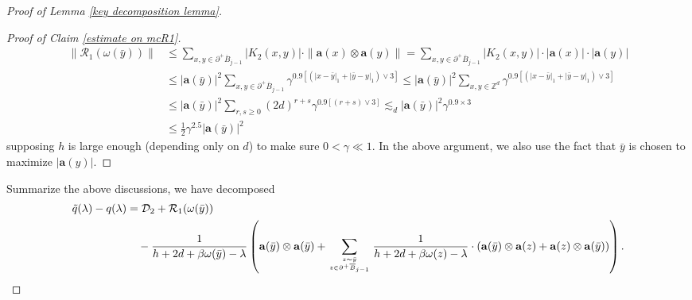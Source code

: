 \documentclass[10pt,a4paper]{amsart}
\newcommand{\Z}{\mathbb{Z}}
\newcommand{\barB}{\overline{B}}
\newcommand{\bfa}{\mathbf{a}}
\newcommand{\mcD}{\mathcal{D}}
\newcommand{\mcR}{\mathcal{R}}
\newcommand{\tq}{\tilde{q}}
\begin{document}
\begin{proof}[Proof of Lemma \ref{key decomposition lemma}]
\begin{proof}[Proof of Claim \ref{estimate on mcR1}]
  \begin{align*}
    \| \mcR_{1}(\omega(\bar{y})) \| & \leq \sum_{x,y\in \partial^+ \barB_{j-1}} |K_2(x,y)|\cdot \| \bfa(x)\otimes \bfa(y) \| = \sum_{x,y\in \partial^+ \barB_{j-1}} |K_2(x,y)|\cdot | \bfa(x)|\cdot |\bfa(y) | \\
          &\leq |\bfa(\bar{y})|^2 \sum_{x,y\in \partial^+ \barB_{j-1}} \gamma^{0.9[(|x-\bar{y}|_1+|\bar{y}-y|_1)\vee 3]} \leq |\bfa(\bar{y})|^2 \sum_{x,y\in \Z^d } \gamma^{0.9[(|x-\bar{y}|_1+|\bar{y}-y|_1)\vee 3]} \\
          &\leq |\bfa(\bar{y})|^2 \sum_{r,s\geq 0} (2d)^{r+s}\gamma^{0.9[(r+s)\vee 3]} \lesssim_d |\bfa(\bar{y})|^2 \gamma^{0.9\times 3} \\
          &\leq \frac{1}{2}\gamma^{2.5} |\bfa(\bar{y})|^2 
  \end{align*}
  supposing $h$ is large enough (depending only on $d$) to make sure  $0<\gamma\ll1$.  In the above argument, we also use the fact that $\bar{y}$ is chosen to maximize $|\bfa(y)|$.

\end{proof}
Summarize the above discussions, we have decomposed
{\small
\begin{align}\label{further baby decomposition 1}
  \tq(\lambda)-q(\lambda)&= \mcD_2 +\mcR_1 (\omega(\bar{y}))\\
  \notag &\ \ \ -\frac{1}{h+2d+\beta \omega(\bar{y})-\lambda}\left(\bfa(\bar{y})\otimes \bfa(\bar{y})+ \sum_{z\sim \bar{y} \atop z\in \partial^+\barB_{j-1}} \frac{1}{h+2d+\beta\omega(z)-\lambda } \cdot(\bfa(\bar{y}) \otimes  \bfa(z)+\bfa(z)\otimes\bfa(\bar{y})  )\right).
\end{align}
}


\end{proof}
\end{document}
